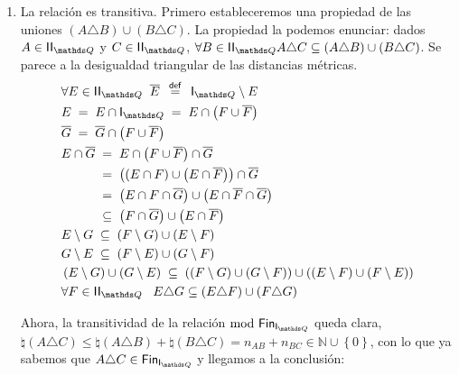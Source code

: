\documentclass[final,12pt,a4paper,twoside,fleqn]{extbook}
\newcommand{\mathdef}{\ensuremath{\stackrel{\mathsf{def}}{{}={}}}}
\newcommand{\set}[1]{\ensuremath{\left\lbrace{#1}\right\rbrace}}
\newcommand{\setN}{\ensuremath{\mathds{N}}}
\theoremstyle{definition}
\theoremstyle{remark}
\begin{document}
\begin{enumerate}
{\begin{enumerate}
  \item { La relación es \textsf{transitiva}. Primero estableceremos una 
      propiedad de las uniones \( \left( A \triangle B \right) \cup 
      \left( B \triangle C \right) \). La propiedad la podemos enunciar: 
      dados \( A \in \IIQ \) y \( C \in \IIQ \), \(\forall B \in \IIQ A 
      \triangle C \subseteq \left( A \triangle B \right) \cup \left( B 
      \triangle C \right) \). Se parece a la desigualdad triangular de 
      las distancias métricas.
  \begin{align}
  &\forall E \in \IIQ \;\; \overline{E} \;\mathdef\; \IQ \setminus E\\
  &E \;=\; E \cap \IQ \;=\; E \cap \left( F \cup \overline{F} \right) \\
  &\overline{G} \;=\; \overline{G} \cap \left( F \cup \overline{F} 
  \right) \\
  &E \cap \overline{G} \;=\; E \cap \left( F \cup \overline{F} \right) 
  \cap \overline{G} \\ \nonumber
  &\phantom{E \cap \overline{G} }\;=\; \left( \left( E \cap F \right) 
  \cup \left( E \cap \overline{F} \right) \right) \cap \overline{G}\\ 
  \nonumber
  &\phantom{E \cap \overline{G} }\;=\; \left( E \cap F \cap \overline{G} 
  \right) \cup \left( E \cap \overline{F} \cap \overline{G} \right) \\  
  \nonumber
  &\phantom{E \cap \overline{G} }\;\subseteq\; \left( F \cap \overline{G}
  \right) \cup \left( E \cap \overline{F} \right) \\
  &E \setminus G \;\subseteq\; \left( F \setminus G \right) \cup \left( E
  \setminus F \right) \\
  &G \setminus E \;\subseteq\; \left( F \setminus E \right) \cup \left( G
  \setminus F \right) \\
  &\left( E \setminus G\right) \cup \left( G \setminus E \right)
  \;\subseteq\; \left( \left( F \setminus G \right) \cup \left( G
  \setminus F \right) \right) \cup \left( \left( E \setminus F \right)
  \cup \left( F \setminus E \right) \right) \\
  &\forall F \in \IIQ \;\;\; E \triangle G \subseteq \left( E \triangle F
  \right) \cup \left( F \triangle G \right)
  \end{align}
  
  
  
  Ahora, la transitividad de la relación \(\FinDiffRel\) queda clara, \(
  \natural \left( A \triangle C \right) \leq \natural \left( A \triangle
  B \right) + \natural \left( B \triangle C \right) = n_{AB} + n_{BC} \in
  \setN \cup \set{0}\), con lo que ya sabemos que \( A \triangle C \in
  \FinIQ \) y llegamos a la conclusión:
  
}
\end{enumerate}}
\end{enumerate}
\end{document}
